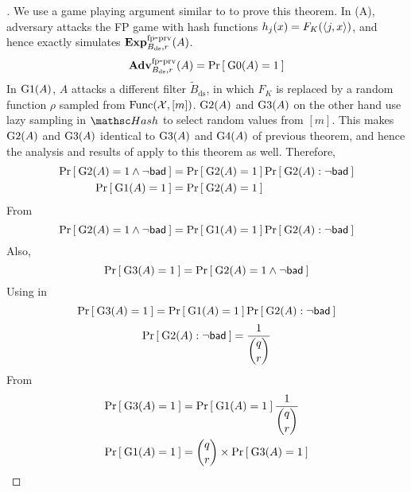 \begin{proof}[]
We use a game playing argument similar to  to prove this theorem. In (A), adversary attacks the FP game with  hash functions $h_j(x) = F_K(\langle j,x \rangle) $, and hence exactly simulates $\mathrm{\mathbf{Exp}}^{\mathrm{fp\mbox{-}prv}}_{B_\mathrm{ds},r}(A)$.
\begin{equation}
\mathrm{\mathbf{Adv}}^{\mathrm{fp\mbox{-}prv}}_{B_\mathrm{ds},r}(A) = \Pr\left[\: \text{G0}(A)=1 \:\right]\label{eq:2T0}
\end{equation}
\noindent
In $\text{G1}(A)$, $A$ attacks a different filter $\tilde{B}_\mathrm{ds}$, in which $F_K$ is replaced by a random function $\rho$ sampled from $\mathrm{Func}({\cal X},[m])$. $\text{G2}(A)$ and $\text{G3}(A)$ on the other hand use lazy sampling in $\Hash$ to select random values from $[m]$. This makes $\text{G2}(A)$ and $\text{G3}(A)$ identical to $\text{G3}(A)$ and $\text{G4}(A)$ of previous theorem, and hence the analysis and results of  apply to this theorem as well. Therefore,
\begin{align}
\Pr\left[\: \text{G2}(A)=1 \wedge \neg\mathsf{bad} \:\right] &= \Pr\left[\: \text{G2}(A)=1 \:\right]\Pr\left[\: \text{G2}(A) : \neg\mathsf{bad} \:\right]\label{eq:2T1} \\
\Pr\left[\: \text{G1}(A)=1 \:\right] &= \Pr\left[\: \text{G2}(A)=1 \:\right]\label{eq:2T2}
\end{align}
From 
\begin{equation}
\Pr\left[\: \text{G2}(A)=1 \wedge \neg\mathsf{bad} \:\right] = \Pr\left[\: \text{G1}(A)=1 \:\right]\Pr\left[\: \text{G2}(A) : \neg\mathsf{bad} \:\right]\label{eq:2T3}
\end{equation}
\noindent
Also,
\begin{equation}
\Pr\left[\: \text{G3}(A)=1 \:\right] = \Pr\left[\: \text{G2}(A)=1 \wedge \neg\mathsf{bad} \:\right]\label{eq:2T4}
\end{equation}
\noindent
Using  in 
\begin{equation}
\Pr\left[\: \text{G3}(A)=1 \:\right] = \Pr\left[\: \text{G1}(A)=1 \:\right]\Pr\left[\: \text{G2}(A) : \neg\mathsf{bad} \:\right]\label{eq:2T5}
\end{equation}
\begin{equation}
\Pr\left[\: \text{G2}(A) : \neg\mathsf{bad} \:\right] = \frac{1}{\dbinom{q}{r}}\label{eq:2T6}
\end{equation}
\noindent
From 
\begin{align}
\nonumber \Pr\left[\: \text{G3}(A)=1 \:\right] &= \Pr\left[\: \text{G1}(A)=1 \:\right]\frac{1}{\dbinom{q}{r}}\\
\Pr\left[\: \text{G1}(A)=1 \:\right] &= \dbinom{q}{r} \times \Pr\left[\: \text{G3}(A)=1 \:\right] \label{eq:2T7}
\end{align}


\end{proof}
